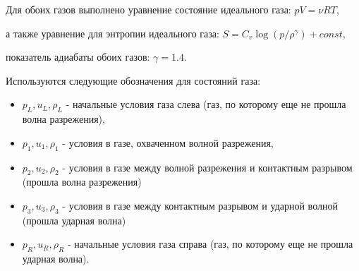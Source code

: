 \documentclass[a4paper,12pt]{extarticle}
\begin{document}
Для обоих газов выполнено уравнение состояние идеального газа: $ pV = \nu RT$, 

а также уравнение для энтропии идеального газа: $S = C_v\log(p/\rho^\gamma)+const$, 

показатель адиабаты обоих газов: $\gamma = 1.4$.

Используются следующие обозначения для состояний газа:
\begin{itemize}
    \item $p_L, u_L, \rho_L$ - начальные условия газа слева (газ, по которому еще не прошла волна разрежения),
    \item $p_1, u_1, \rho_1$ - условия в газе, охваченном волной разрежения,
    \item $p_2, u_2, \rho_2$ - условия в газе между волной разрежения и контактным разрывом (прошла волна разрежения)
    \item $p_3, u_3, \rho_3$ - условия в газе между контактным разрывом и ударной волной (прошла ударная волна)
    \item $p_R, u_R, \rho_R$ - начальные условия газа справа (газ, по которому еще не прошла ударная волна).
\end{itemize}
\end{document}

